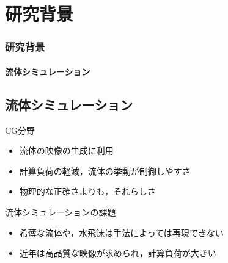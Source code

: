 \documentclass[aspectratio=169,dvipdfmx,hyperref={bookmarks=true}]{beamer}
\begin{document}
   \section{研究背景}
 \begin{frame}
 \frametitle{研究背景}
   \framesubtitle{流体シミュレーション}
 \subsection{流体シミュレーション}
\begin{block}{CG分野}
\begin{itemize}
	\item 流体の映像の生成に利用
	\item 計算負荷の軽減，流体の挙動が制御しやすさ
	\item 物理的な正確さよりも，それらしさ
\end{itemize}
\end{block}

 \begin{block}{流体シミュレーションの課題}
  \begin{itemize}
\item 希薄な流体や，水飛沫は手法によっては再現できない
\item 近年は高品質な映像が求められ，計算負荷が大きい
\end{itemize}
\end{block}
 \end{frame}
\end{document}

